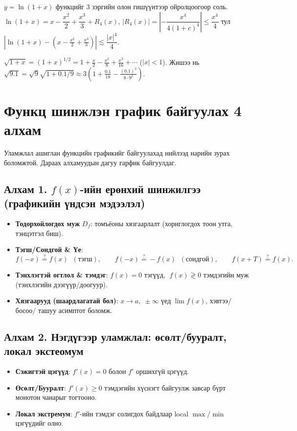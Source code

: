 \begin{example} $y=\ln(1+x)$ функцийг 3 зэргийн олон гишүүнтээр ойролцоогоор соль.\\
$\ln(1+x)=x-\dfrac{x^2}{2}+\dfrac{x^3}{3}+R_4(x)$,\quad 
$|R_4(x)|=|- \dfrac{x^4}{4(1+c)^4}|\leq \dfrac{x^4}{4}$ тул  $|\ln(1+x) - (x-\tfrac{x^2}{2}+\tfrac{x^3}{3})|\lesssim \dfrac{|x|^4}{4}$.
\end{example}

\begin{example}
$\sqrt{1+x}=(1+x)^{1/2}=1+\frac{x}{2}-\frac{x^2}{8}+\frac{x^3}{16}+\cdots$ ($|x|<1$). 
Жишээ нь $\sqrt{9.1}=\sqrt{9}\sqrt{1+0.1/9}\approx 3\!\left(1+\frac{0.1}{18}-\frac{(0.1)^2}{8\cdot 9^2}\right)$.
\end{example}
\section{Функц шинжлэн график байгуулах 4 алхам}
Уламжлал ашиглан функцийн графикийг байгуулахад нийлээд нарийн зурах боломжтой. Дараах алхамуудын дагуу гарфик байгуулдаг.
\subsection*{Алхам 1. $f(x)$-ийн ерөнхий шинжилгээ (графикийн үндсэн мэдээлэл)}
\begin{itemize}
  \item \textbf{Тодорхойлогдох муж} $D_f$: томъёоны хязгаарлалт (хориглогдох тоон утга, тэнцэтгэл биш).
  \item \textbf{Тэгш/Сондгой \& Үе}: 
  \[
    f(-x)\stackrel{?}{=}f(x)\;\;(\text{тэгш}), \qquad
    f(-x)\stackrel{?}{=}-f(x)\;\;(\text{сондгой}), \qquad
    f(x+T)\stackrel{?}{=}f(x).
  \]
  \item \textbf{Тэнхлэгтэй огтлол \& тэмдэг}: $f(x)=0$ тэгүүд, $\;f(x)\gtrless 0$ тэмдэгийн муж (тэнхлэгийн дээгүүр/доогуур).
  \item \textbf{Хязгаарууд (шаардлагатай бол)}: $x\to a,\;\pm\infty$ үед $\lim f(x)$, хэвтээ/босоо/ ташуу асимптот боломж.
\end{itemize}

\subsection*{Алхам 2. Нэгдүгээр уламжлал: өсөлт/бууралт, локал экстеомум}
\begin{itemize}
  \item \textbf{Сэжигтэй цэгүүд}: $f'(x)=0$ болон $f'$ оршихгүй цэгүүд.
  \item \textbf{Өсөлт/Бууралт}: $f'(x)\geq 0$ тэмдэгийн хүснэгт байгуулж завсар бүрт монотон чанарыг тогтооно.
  \item \textbf{Локал экстремум}: $f'$-ийн тэмдэг солигдох байдлаар local \(\max/\min\) цэгүүдийг олно.
\end{itemize}

